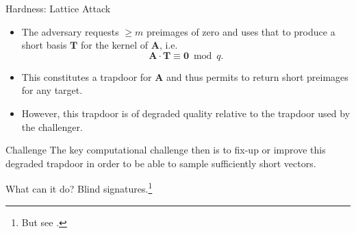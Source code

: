 \documentclass[xcolor=table,10pt,aspectratio=169]{beamer}
\renewcommand{\vec}[1]{\ensuremath{\mathbf{#1}}\xspace}
\providecommand{\mat}[1]{\ensuremath{\vec{#1}}\xspace}
\begin{document}
\begin{frame}[label={sec:org08c7480}]{Hardness: Lattice Attack}
\begin{itemize}
\item The adversary requests \(\geq m\) preimages of zero and uses that to produce a short basis \(\mat{T}\) for the kernel of \(\mat{A}\), i.e. 
\[
  \mat{A}\cdot\mat{T} \equiv \vec{0} \bmod q.
  \]
\item This constitutes a trapdoor for \(\mat{A}\) and thus permits to return short preimages for any target.
\item However, this trapdoor is of degraded quality relative to the trapdoor used by the challenger.
\end{itemize}

\begin{block}{Challenge}
The key computational challenge then is to fix-up or improve this degraded trapdoor in order to be able to sample sufficiently short vectors.
\end{block}
\end{frame}

\begin{frame}[label={sec:org1a6cbaa}]{What can it do?}
Blind signatures.\footnote{But see .}
\end{frame}
\end{document}

